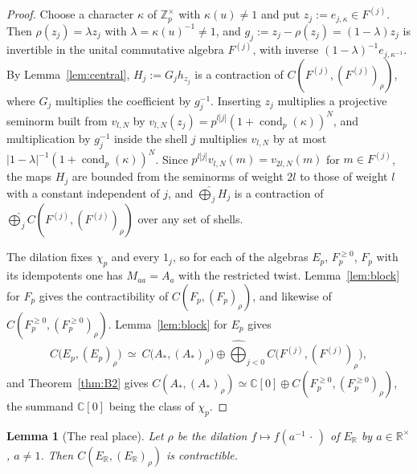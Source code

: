 \documentclass[11pt]{amsart}
\newtheorem{lemma}[theorem]{Lemma}
\theoremstyle{definition}
\theoremstyle{remark}
\newcommand{\C}{\mathbb C}
\newcommand{\R}{\mathbb R}
\newcommand{\Z}{\mathbb Z}
\newcommand{\cond}{\operatorname{cond}}
\begin{document}
\begin{proof}
Choose a character $\kappa$ of $\Z_p^{\times}$ with $\kappa(u)\ne1$ and put
$z_j:=e_{j,\kappa}\in F^{(j)}$.  Then $\rho(z_j)=\lambda z_j$ with
$\lambda=\kappa(u)^{-1}\ne1$, and $g_j:=z_j-\rho(z_j)=(1-\lambda)z_j$ is
invertible in the unital commutative algebra $F^{(j)}$, with inverse
$(1-\lambda)^{-1}e_{j,\kappa^{-1}}$.  By Lemma~\ref{lem:central},
$H_j:=G_jh_{z_j}$ is a contraction of $C(F^{(j)},(F^{(j)})_{\rho})$, where
$G_j$ multiplies the coefficient by $g_j^{-1}$.  Inserting $z_j$ multiplies a
projective seminorm built from $v_{l,N}$ by
$v_{l,N}(z_j)=p^{l|j|}(1+\cond_p(\kappa))^{N}$, and multiplication by $g_j^{-1}$
inside the shell $j$ multiplies $v_{l,N}$ by at most
$|1-\lambda|^{-1}(1+\cond_p(\kappa))^{N}$.  Since $p^{l|j|}v_{l,N}(m)=v_{2l,N}(m)$
for $m\in F^{(j)}$, the maps $H_j$ are bounded from the seminorms of weight
$2l$ to those of weight $l$ with a constant independent of $j$, and
$\widehat\bigoplus_jH_j$ is a contraction of
$\widehat\bigoplus_jC(F^{(j)},(F^{(j)})_{\rho})$ over any set of shells.

The dilation fixes $\chi_p$ and every $1_j$, so for each of the algebras
$E_p$, $F_p^{\ge0}$, $F_p$ with its idempotents one has $M_{aa}=A_a$ with the
restricted twist.  Lemma~\ref{lem:block} for $F_p$ gives the contractibility
of $C(F_p,(F_p)_{\rho})$, and likewise of
$C(F_p^{\ge0},(F_p^{\ge0})_{\rho})$.  Lemma~\ref{lem:block} for $E_p$ gives
\[
C\bigl(E_p,(E_p)_{\rho}\bigr)\ \simeq\ C\bigl(A_*,(A_*)_{\rho}\bigr)\oplus
\widehat\bigoplus_{j<0}C\bigl(F^{(j)},(F^{(j)})_{\rho}\bigr),
\]
and Theorem~\ref{thm:B2} gives $C(A_*,(A_*)_{\rho})\simeq\C[0]\oplus
C(F_p^{\ge0},(F_p^{\ge0})_{\rho})$, the summand $\C[0]$ being the class of
$\chi_p$.
\end{proof}

\begin{lemma}[The real place]\label{lem:arch}
Let $\rho$ be the dilation $f\mapsto f(a^{-1}\,\cdot\,)$ of $E_{\R}$ by
$a\in\R^{\times}$, $a\ne1$.  Then $C(E_{\R},(E_{\R})_{\rho})$ is
contractible.
\end{lemma}
\end{document}
